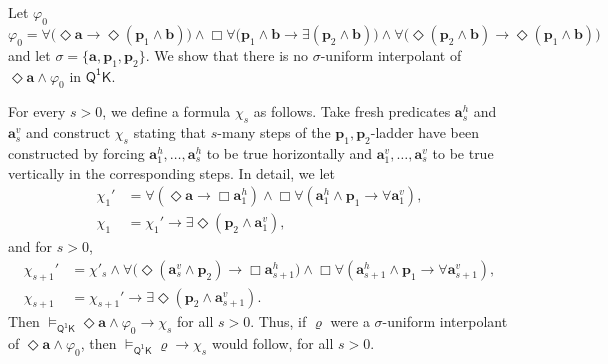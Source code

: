 \documentclass{lmcs} %
\theoremstyle{plain}\newtheorem{satz}[thm]{Satz} %
\newcommand{\FOMK}{\ensuremath{\mathsf{Q^1K}}}
\newcommand{\fform}[1]{\boldsymbol{#1}}
\newcommand{\pvar}{\fform{p}}
\newcommand{\avar}{\fform{a}}
\newcommand{\bvar}{\fform{b}}
\newcommand{\Bv}{\forall}
\newcommand{\Bh}{\Box}
\newcommand{\Dv}{\exists}
\newcommand{\Dh}{\Diamond}
\begin{document}
\begin{exa}\label{ex62}
	Let $\varphi_{0}$ %
	$$
	\varphi_{0} = \Bv \bigl(\Dh\avar \rightarrow \Dh (\pvar_{1} \wedge \bvar)\bigr) \land 
	\Bh \Bv \bigl(\pvar_{1} \wedge \bvar \rightarrow \Dv (\pvar_{2} \wedge \bvar)\bigr)\land
	\Bv \bigl(\Dh (\pvar_{2} \wedge \bvar) \rightarrow \Dh (\pvar_1 \wedge \bvar)\bigr)
	$$
	and let $\sigma=\{\avar,\pvar_{1},\pvar_{2}\}$.  
	We show that there is no $\sigma$-uniform interpolant of
	$\Diamond \avar \wedge \varphi_{0}$ in $\FOMK{}$.  
	
	For every $s>0$, we define a formula $\chi_{s}$ as follows. Take fresh predicates $\avar_{s}^h$ and $\avar_{s}^v$ and construct
	$\chi_{s}$ stating that $s$-many steps of the $\pvar_{1},\pvar_{2}$-ladder have been constructed by forcing $\avar_{1}^h,\ldots,\avar_{s}^h$ to be true
	horizontally and $\avar_{1}^v,\ldots,\avar_{s}^v$ to be true vertically in the corresponding steps.  
	In detail, we let
	\begin{align*}
		\chi_{1}' & = \Bv(\Dh\avar \rightarrow \Box \avar_{1}^h) \wedge \Bh\Bv (\avar_{1}^h \wedge \pvar_{1} \rightarrow \Bv \avar_{1}^v),\\
		\chi_{1} & = \chi_{1}' \rightarrow \exists \Diamond (\pvar_{2} \wedge \avar_{1}^v),
	\end{align*}	
	and for $s>0$,
	\begin{align*}
		\chi_{s+1}' & = \chi'_s\land\Bv\bigl(\Dh(\avar_s^v\land\pvar_2) \rightarrow \Box \avar_{s+1}^h\bigr)  
		\wedge \Bh\Bv (\avar_{s+1}^h \wedge \pvar_{1} \rightarrow \Bv \avar_{s+1}^v),\\
		\chi_{s+1} & = \chi_{s+1}' \rightarrow \exists \Diamond (\pvar_{2} \wedge \avar_{s+1}^v).
	\end{align*}	
	Then $\models_\FOMK \Diamond \avar\land \varphi_0\to \chi_s$ for all $s>0$.
	Thus, if $\varrho$ were a $\sigma$-uniform interpolant of $\Diamond \avar\land\varphi_0$, then
	$\models_\FOMK\varrho\to \chi_s$ would follow, for all $s>0$.
	

\end{exa}
\end{document}
